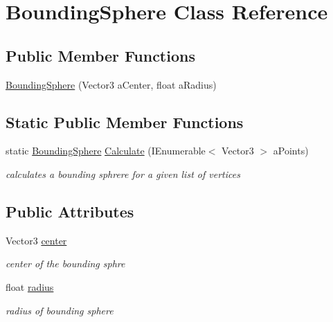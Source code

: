 \hypertarget{class_bounding_sphere}{}\section{Bounding\+Sphere Class Reference}
\label{class_bounding_sphere}
\subsection*{Public Member Functions}
\begin{DoxyCompactItemize}
\item 
\mbox{\hyperlink{class_bounding_sphere_ad35e7960a2e532e8f7cbebbca2136ef7}{Bounding\+Sphere}} (Vector3 a\+Center, float a\+Radius)
\end{DoxyCompactItemize}
\subsection*{Static Public Member Functions}
\begin{DoxyCompactItemize}
\item 
static \mbox{\hyperlink{class_bounding_sphere}{Bounding\+Sphere}} \mbox{\hyperlink{class_bounding_sphere_a29c277d13a701089666b94fabf3c87d6}{Calculate}} (I\+Enumerable$<$ Vector3 $>$ a\+Points)
\begin{DoxyCompactList}\small\item\em calculates a bounding sphrere for a given list of vertices \end{DoxyCompactList}\end{DoxyCompactItemize}
\subsection*{Public Attributes}
\begin{DoxyCompactItemize}
\item 
Vector3 \mbox{\hyperlink{class_bounding_sphere_a0996d0f450c5e7fcca8446ebbd8ddc20}{center}}
\begin{DoxyCompactList}\small\item\em center of the bounding sphre \end{DoxyCompactList}\item 
float \mbox{\hyperlink{class_bounding_sphere_ad507cd54bc4021617024c2545fe9379c}{radius}}
\begin{DoxyCompactList}\small\item\em radius of bounding sphere \end{DoxyCompactList}\end{DoxyCompactItemize}


